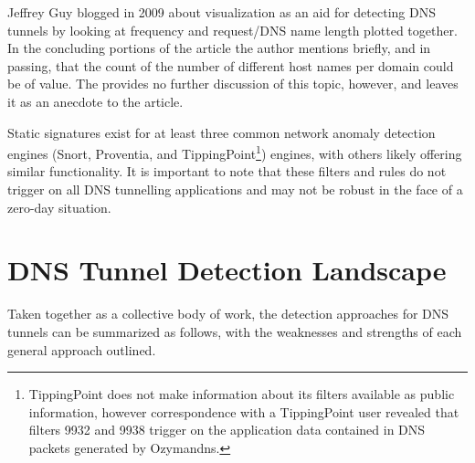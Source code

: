 \documentclass[12pt]{report}
\theoremstyle{remark}
\theoremstyle{definition}
\theoremstyle{definition}
\theoremstyle{definition}
\begin{document}
Jeffrey Guy blogged in 2009 about visualization as an aid for detecting DNS
tunnels by looking at frequency and request/DNS name length plotted together. In
the concluding portions of the article the author mentions briefly, and in
passing, that the count of the number of different host names per domain could
be of value. The provides no further discussion of this topic, however, and
leaves it as an anecdote to the article.

Static signatures exist for at least three common network anomaly detection
engines (Snort\cite{Chamberland2009.snort_iodine},
Proventia\cite{Proventia2013.ips_tunnel}, and TippingPoint\footnote{TippingPoint
does not make information about its filters available as public information,
however correspondence with a TippingPoint user revealed that filters 9932 and
9938 trigger on the application data contained in DNS packets generated by
Ozymandns.}) engines, with others likely offering similar functionality. It is
important to note that these filters and rules do not trigger on all DNS
tunnelling applications and may not be robust in the face of a zero-day
situation.

\section{DNS Tunnel Detection Landscape}
\label{litsummary}
Taken together as a collective body of work, the detection approaches for DNS
tunnels can be summarized as follows, with the weaknesses and strengths of each general approach outlined.
\end{document}
